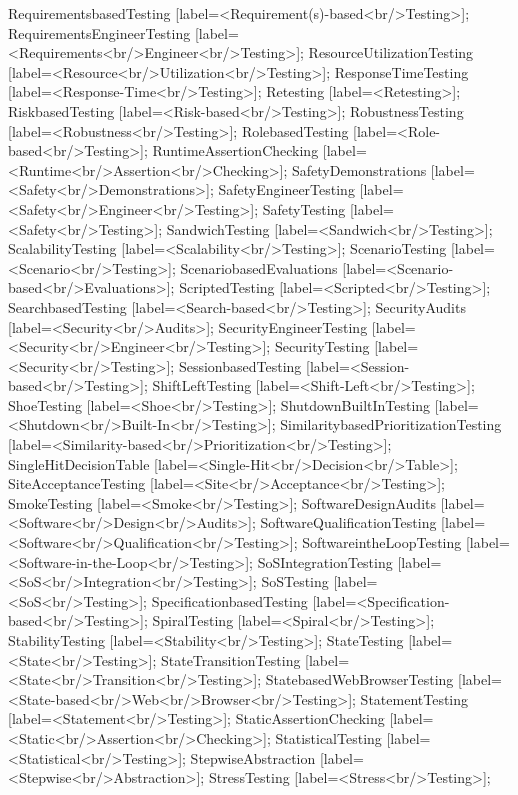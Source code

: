 \documentclass{article}
\begin{document}
{RequirementsbasedTesting [label=<Requirement(s)-based<br/>Testing>];
RequirementsEngineerTesting [label=<Requirements<br/>Engineer<br/>Testing>];
ResourceUtilizationTesting [label=<Resource<br/>Utilization<br/>Testing>];
ResponseTimeTesting [label=<Response-Time<br/>Testing>];
Retesting [label=<Retesting>];
RiskbasedTesting [label=<Risk-based<br/>Testing>];
RobustnessTesting [label=<Robustness<br/>Testing>];
RolebasedTesting [label=<Role-based<br/>Testing>];
RuntimeAssertionChecking [label=<Runtime<br/>Assertion<br/>Checking>];
SafetyDemonstrations [label=<Safety<br/>Demonstrations>];
SafetyEngineerTesting [label=<Safety<br/>Engineer<br/>Testing>];
SafetyTesting [label=<Safety<br/>Testing>];
SandwichTesting [label=<Sandwich<br/>Testing>];
ScalabilityTesting [label=<Scalability<br/>Testing>];
ScenarioTesting [label=<Scenario<br/>Testing>];
ScenariobasedEvaluations [label=<Scenario-based<br/>Evaluations>];
ScriptedTesting [label=<Scripted<br/>Testing>];
SearchbasedTesting [label=<Search-based<br/>Testing>];
SecurityAudits [label=<Security<br/>Audits>];
SecurityEngineerTesting [label=<Security<br/>Engineer<br/>Testing>];
SecurityTesting [label=<Security<br/>Testing>];
SessionbasedTesting [label=<Session-based<br/>Testing>];
ShiftLeftTesting [label=<Shift-Left<br/>Testing>];
ShoeTesting [label=<Shoe<br/>Testing>];
ShutdownBuiltInTesting [label=<Shutdown<br/>Built-In<br/>Testing>];
SimilaritybasedPrioritizationTesting [label=<Similarity-based<br/>Prioritization<br/>Testing>];
SingleHitDecisionTable [label=<Single-Hit<br/>Decision<br/>Table>];
SiteAcceptanceTesting [label=<Site<br/>Acceptance<br/>Testing>];
SmokeTesting [label=<Smoke<br/>Testing>];
SoftwareDesignAudits [label=<Software<br/>Design<br/>Audits>];
SoftwareQualificationTesting [label=<Software<br/>Qualification<br/>Testing>];
SoftwareintheLoopTesting [label=<Software-in-the-Loop<br/>Testing>];
SoSIntegrationTesting [label=<SoS<br/>Integration<br/>Testing>];
SoSTesting [label=<SoS<br/>Testing>];
SpecificationbasedTesting [label=<Specification-based<br/>Testing>];
SpiralTesting [label=<Spiral<br/>Testing>];
StabilityTesting [label=<Stability<br/>Testing>];
StateTesting [label=<State<br/>Testing>];
StateTransitionTesting [label=<State<br/>Transition<br/>Testing>];
StatebasedWebBrowserTesting [label=<State-based<br/>Web<br/>Browser<br/>Testing>];
StatementTesting [label=<Statement<br/>Testing>];
StaticAssertionChecking [label=<Static<br/>Assertion<br/>Checking>];
StatisticalTesting [label=<Statistical<br/>Testing>];
StepwiseAbstraction [label=<Stepwise<br/>Abstraction>];
StressTesting [label=<Stress<br/>Testing>];
}
\end{document}
